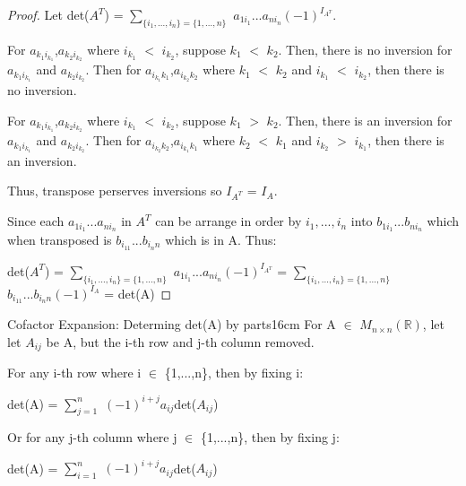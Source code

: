     \begin{proof}
        Let det($A^T$) =
        $\sum_{\{i_1,...,i_n\} = \{1,...,n\}}$
            $a_{1i_1}...a_{ni_n}(-1)^{I_{A^T}}$.
        
        For $a_{k_1i_{k_1}}$,$a_{k_2i_{k_2}}$
        where $i_{k_1}$ $<$ $i_{k_2}$, suppose $k_1$ $<$ $k_2$.
        Then, there is no inversion for $a_{k_1i_{k_1}}$
        and $a_{k_2i_{k_2}}$.
        Then for $a_{i_{k_1}k_1}$,$a_{i_{k_2}k_2}$
        where $k_1$ $<$ $k_2$ and $i_{k_1}$ $<$ $i_{k_2}$,
        then there is no inversion.

        For $a_{k_1i_{k_1}}$,$a_{k_2i_{k_2}}$
        where $i_{k_1}$ $<$ $i_{k_2}$, suppose $k_1$ $>$ $k_2$.
        Then, there is an inversion for $a_{k_1i_{k_1}}$
        and $a_{k_2i_{k_2}}$.
        Then for $a_{i_{k_2}k_2}$,$a_{i_{k_1}k_1}$
        where $k_2$ $<$ $k_1$ and $i_{k_2}$ $>$ $i_{k_1}$,
        then there is an inversion.

        Thus, transpose perserves inversions
        so $I_{A^T}$ = $I_A$.

        Since each $a_{1i_1}...a_{ni_n}$ in $A^T$
        can be arrange in order by $i_1,...,i_n$
        into $b_{1i_1}...b_{ni_n}$
        which when transposed is $b_{i_11}...b_{i_nn}$
        which is in A. Thus:

        \hspace{0.05cm}
        det($A^T$) =
        $\sum_{\{i_1,...,i_n\} = \{1,...,n\}}$
            $a_{1i_1}...a_{ni_n}(-1)^{I_{A^T}}$
        = $\sum_{\{i_1,...,i_n\} = \{1,...,n\}}$
            $b_{i_11}...b_{i_nn}(-1)^{I_A}$
        = det(A)
    \end{proof}

    \newpage



    \begin{wtheorem}{Cofactor Expansion: Determing det(A) by parts}{16cm}
        For A $\in$ $M_{n \times n}(\mathbb{R})$, let
        let $A_{ij}$ be A, but the i-th row and j-th column removed.
        
        For any i-th row where i $\in$ \{1,...,n\}, then by fixing i:

        \hspace{0.5cm}
        det(A) = $\sum_{j=1}^n$ $(-1)^{i+j}a_{ij}$det($A_{ij}$)

        Or for any j-th column where j $\in$ \{1,...,n\}, then by fixing j:

        \hspace{0.5cm}
        det(A) = $\sum_{i=1}^n$ $(-1)^{i+j}a_{ij}$det($A_{ij}$)
    \end{wtheorem}

